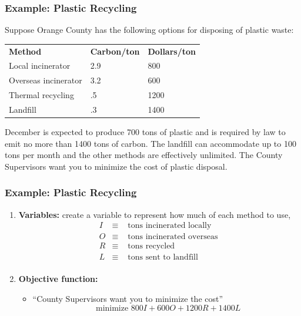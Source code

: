 \documentclass{beamer}
\begin{document}
\begin{frame} \frametitle{Example: Plastic Recycling}
  Suppose Orange County has the following options for disposing of plastic waste:
  \begin{center}
  \begin{tabular}{lll}
    \textbf{Method} & \textbf{Carbon/ton} & \textbf{Dollars/ton} \\
    Local incinerator & 2.9 & 800 \\
    Overseas incinerator & 3.2 & 600 \\
    Thermal recycling & .5 & 1200 \\
    Landfill & .3 & 1400 \\
  \end{tabular}
\end{center}
  December is expected to produce 700 tons of plastic and is required by law
  to emit no more than 1400 tons of carbon. The landfill can accommodate up
  to 100 tons per month and the other methods are effectively unlimited.
  The County Supervisors want you to minimize the cost of plastic disposal.
\end{frame}

\begin{frame} \frametitle{Example: Plastic Recycling}
\begin{enumerate}
  \item \textbf{Variables:} create a variable to represent how much of each
    method to use,
    \begin{eqnarray*}
      I &\equiv& \text{ tons incinerated locally } \\
      O &\equiv& \text{ tons incinerated overseas } \\
      R &\equiv& \text{ tons recycled } \\
      L &\equiv& \text{ tons sent to landfill } \\
    \end{eqnarray*}
  \item \textbf{Objective function:}
  \begin{itemize}
    \item ``County Supervisors want you to minimize the cost''
    \[ \text{ minimize } 800I + 600O + 1200R + 1400L \]
  \end{itemize}
\end{enumerate}
\end{frame}
\end{document}
